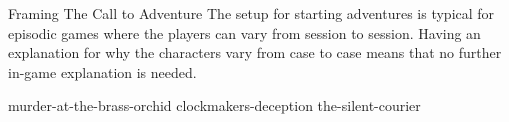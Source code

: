 \begin{CommentBox}{Framing The Call to Adventure}
	The setup for starting adventures is typical for episodic games where the players can vary from session to session. Having an explanation for why the characters vary from case to case means that no further in-game explanation is needed.
\end{CommentBox}



%


{murder-at-the-brass-orchid}
{clockmakers-deception}
{the-silent-courier}


